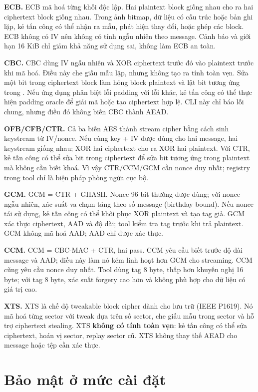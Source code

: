 \documentclass[12pt,a4paper,oneside]{report}
\let\origtexttt\texttt
\renewcommand{\texttt}[1]{\origtexttt{\seqsplit{#1}}}
\begin{document}
\textbf{ECB.} ECB mã hoá từng khối độc lập. Hai plaintext block giống nhau cho ra hai ciphertext block giống nhau. Trong ảnh bitmap, dữ liệu có cấu trúc hoặc bản ghi lặp, kẻ tấn công có thể nhận ra mẫu, phát hiện thay đổi, hoặc ghép các block. ECB không có IV nên không có tính ngẫu nhiên theo message. Cảnh báo và giới hạn 16 KiB chỉ giảm khả năng sử dụng sai, không làm ECB an toàn.


\textbf{CBC.} CBC dùng IV ngẫu nhiên và XOR ciphertext trước đó vào plaintext trước khi mã hoá. Điều này che giấu mẫu lặp, nhưng không tạo ra tính toàn vẹn. Sửa một bit trong ciphertext block \texttt{C\_i} làm hỏng block plaintext \texttt{P\_i} và lật bit tương ứng trong \texttt{P\_(i+1)}. Nếu ứng dụng phân biệt lỗi padding với lỗi khác, kẻ tấn công có thể thực hiện padding oracle để giải mã hoặc tạo ciphertext hợp lệ. CLI này chỉ báo lỗi chung, nhưng điều đó không biến CBC thành AEAD.


\textbf{OFB/CFB/CTR.} Cả ba biến AES thành stream cipher bằng cách sinh keystream từ IV/nonce. Nếu cùng key + IV được dùng cho hai message, hai keystream giống nhau; XOR hai ciphertext cho ra XOR hai plaintext. Với CTR, kẻ tấn công có thể sửa bit trong ciphertext để sửa bit tương ứng trong plaintext mà không cần biết khoá. Vì vậy CTR/CCM/GCM cần nonce duy nhất; registry trong tool chỉ là biện pháp phòng ngừa cục bộ.


\textbf{GCM.} GCM = CTR + GHASH. Nonce 96-bit thường được dùng; với nonce ngẫu nhiên, xác suất va chạm tăng theo số message (birthday bound). Nếu nonce tái sử dụng, kẻ tấn công có thể khôi phục XOR plaintext và tạo tag giả. GCM xác thực ciphertext, AAD và độ dài; tool kiểm tra tag trước khi trả plaintext. GCM không mã hoá AAD; AAD chỉ được xác thực.


\textbf{CCM.} CCM = CBC-MAC + CTR, hai pass. CCM yêu cầu biết trước độ dài message và AAD; điều này làm nó kém linh hoạt hơn GCM cho streaming. CCM cũng yêu cầu nonce duy nhất. Tool dùng tag 8 byte, thấp hơn khuyến nghị 16 byte; với tag 8 byte, xác suất forgery cao hơn và không phù hợp cho dữ liệu có giá trị cao.


\textbf{XTS.} XTS là chế độ tweakable block cipher dành cho lưu trữ (IEEE P1619). Nó mã hoá từng sector với tweak dựa trên số sector, che giấu mẫu trong sector và hỗ trợ ciphertext stealing. XTS \textbf{không có tính toàn vẹn}: kẻ tấn công có thể sửa ciphertext, hoán vị sector, replay sector cũ. XTS không thay thế AEAD cho message hoặc tệp cần xác thực.


\section{Bảo mật ở mức cài đặt}
\end{document}
